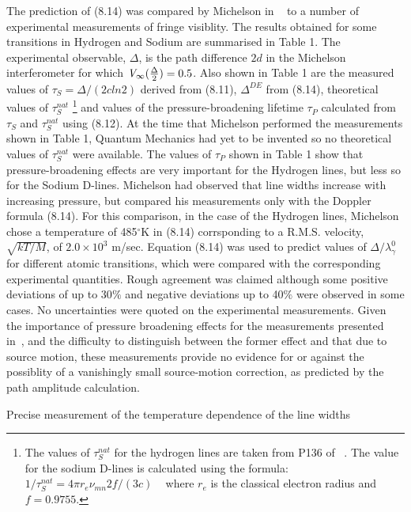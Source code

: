 {      \par The prediction of (8.14) was compared by Michelson in ~\cite{Michelson1} to a number of experimental
   measurements of fringe visiblity. The results obtained for some transitions in Hydrogen and Sodium are 
   summarised in Table 1. The experimental observable, $\Delta$, is the path difference $2d$ in the
   Michelson interferometer for which ${\it V}_{\infty}(\frac{\Delta}{2}) = 0.5$. Also shown in
   Table 1 are the measured values of $\tau_S = \Delta/(2cln2)$ derived from (8.11), $\Delta^{DE}$ from (8.14), 
    theoretical values of $\tau_S^{nat}$
   \footnote{The values of $\tau_S^{nat}$ for the hydrogen lines are taken from P136 of ~\cite{CS}.
    The value for the sodium D-lines is calculated using the formula: $1/\tau_S^{nat} = 4 \pi r_e \nu_{mn}2 f/(3c)$
    ~\cite{Ditchburn} where $r_e$ is the classical electron radius and $f = 0.9755$.} and 
   values of the pressure-broadening lifetime $\tau_P$ calculated from  $\tau_S$ and
     $\tau_S^{nat}$ using (8.12). At the time that Michelson performed the measurements shown
    in Table 1, Quantum Mechanics had yet to be invented so no theoretical values of $\tau_S^{nat}$
    were available. The values of $\tau_P$ shown in Table 1 show that pressure-broadening effects
    are very important for the Hydrogen lines, but less so for the Sodium D-lines. Michelson had observed
   that  line widths increase with increasing pressure, but compared his measurements only with the
    Doppler formula (8.14). For this comparison, in the case of the Hydrogen lines, Michelson 
    chose a temperature of 485$^{\circ}$K in (8.14) corrsponding to a R.M.S. velocity, $\sqrt{kT/M}$,
    of $2.0 \times 10^3$ m/sec. Equation (8.14) was used to predict values of $\Delta/\lambda_{\gamma}^0$
    for different atomic transitions, which were compared with the corresponding experimental quantities.
    Rough agreement was claimed although some positive deviations of up to 30$\%$ and negative 
    deviations up to 40$\%$ were observed in some cases. No uncertainties were quoted on the
   experimental measurements. Given the importance of
   pressure broadening effects for the measurements presented in~\cite{Michelson1}, and the
    difficulty to distinguish between the former effect and that due to source motion,
    these measurements provide no evidence for or against the possiblity of a vanishingly small
    source-motion correction, as predicted by the path amplitude calculation.  
  \par Precise measurement of the temperature dependence of the line widths
}
